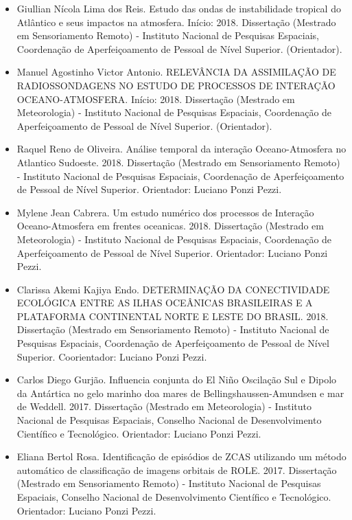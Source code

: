 \documentclass[11pt, a4paper]{awesome-cv}
\begin{document}
\begin{cvletter}
\begin{itemize}
  \item[] Giullian Nícola Lima dos Reis. Estudo das ondas de instabilidade tropical do Atlântico e seus impactos na atmosfera. Início: 2018. Dissertação (Mestrado em Sensoriamento Remoto) - Instituto Nacional de Pesquisas Espaciais, Coordenação de Aperfeiçoamento de Pessoal de Nível Superior. (Orientador). 
  \item[] Manuel Agostinho Victor Antonio. RELEVÂNCIA DA ASSIMILAÇÃO DE RADIOSSONDAGENS NO ESTUDO DE PROCESSOS DE INTERAÇÃO OCEANO-ATMOSFERA. Início: 2018. Dissertação (Mestrado em Meteorologia) - Instituto Nacional de Pesquisas Espaciais, Coordenação de Aperfeiçoamento de Pessoal de Nível Superior. (Orientador). 
  \item[] Raquel Reno de Oliveira. Análise temporal da interação Oceano-Atmosfera no Atlantico Sudoeste. 2018. Dissertação (Mestrado em Sensoriamento Remoto) - Instituto Nacional de Pesquisas Espaciais, Coordenação de Aperfeiçoamento de Pessoal de Nível Superior. Orientador: Luciano Ponzi Pezzi. 
  \item[] Mylene Jean Cabrera. Um estudo numérico dos processos de Interação Oceano-Atmosfera em frentes oceanicas. 2018. Dissertação (Mestrado em Meteorologia) - Instituto Nacional de Pesquisas Espaciais, Coordenação de Aperfeiçoamento de Pessoal de Nível Superior. Orientador: Luciano Ponzi Pezzi. 
  \item[] Clarissa Akemi Kajiya Endo. DETERMINAÇÃO DA CONECTIVIDADE ECOLÓGICA ENTRE AS ILHAS OCEÂNICAS BRASILEIRAS E A PLATAFORMA CONTINENTAL NORTE E LESTE DO BRASIL. 2018. Dissertação (Mestrado em Sensoriamento Remoto) - Instituto Nacional de Pesquisas Espaciais, Coordenação de Aperfeiçoamento de Pessoal de Nível Superior. Coorientador: Luciano Ponzi Pezzi. 
  \item[] Carlos Diego Gurjão. Influencia conjunta do El Niño Oscilação Sul e Dipolo da Antártica no gelo marinho doa mares de Bellingshaussen-Amundsen e mar de Weddell. 2017. Dissertação (Mestrado em Meteorologia) - Instituto Nacional de Pesquisas Espaciais, Conselho Nacional de Desenvolvimento Científico e Tecnológico. Orientador: Luciano Ponzi Pezzi. 
  \item[] Eliana Bertol Rosa. Identificação de episódios de ZCAS utilizando um método automático de classificação de imagens orbitais de ROLE. 2017. Dissertação (Mestrado em Sensoriamento Remoto) - Instituto Nacional de Pesquisas Espaciais, Conselho Nacional de Desenvolvimento Científico e Tecnológico. Orientador: Luciano Ponzi Pezzi. 

\end{itemize}
\end{cvletter}
\end{document}
